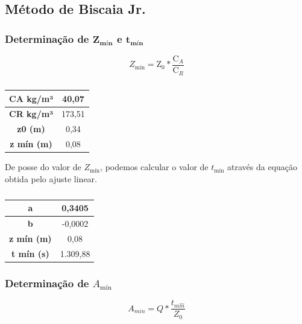 \subsection{Método de Biscaia Jr.}

\subsubsection{Determinação de $ \mathbf{Z_{\text{mín}}} $ e $ \mathbf{t_{\text{mín}}} $}


\begin{equation}\label{key}
Z_{\text{mín}} =\mathrm{Z}_{0} * \frac{\mathrm{C}_{A}}{\mathrm{C}_{R}}
\end{equation}

\begin{table}[H]
	\centering
	\begin{tabular}{|c|c|}
		\hline
		\textbf{CA kg/m³} & 40,07 \\ \hline
		\textbf{CR kg/m³} & 173,51 \\ \hline
		\textbf{z0 (m)} & 0,34 \\ \hline
		\textbf{z mín (m)} & 0,08 \\ \hline
	\end{tabular}
	\caption{}
	\label{zmin}
\end{table}

De posse do valor de $ Z_{\text{mín}} $, podemos calcular o valor de $ t_{\text{mín}} $ através da equação obtida pelo ajuste linear.

\begin{table}[H]
	\centering
	\begin{tabular}{|c|c|}
		\hline
		\textbf{a} & 0,3405 \\ \hline
		\textbf{b} & -0,0002 \\ \hline
		\textbf{z mín (m)} & 0,08 \\ \hline
		\textbf{t mín (s)} & 1.309,88 \\ \hline
	\end{tabular}
	\caption{}
	\label{tmin}
\end{table}

\subsubsection{Determinação de $ A_{\text{mín}} $}

\begin{equation}\label{key}
A_{m i n}=Q * \frac{t_{m \hat{m}}}{Z_{0}}
\end{equation}

